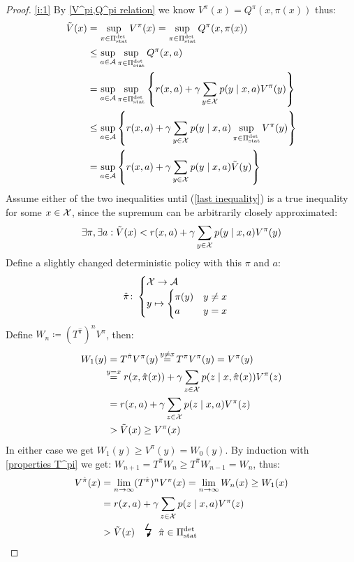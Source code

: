 \begin{proof} \ref{i:1}
By \ref{V^pi,Q^pi relation} we know \(V^\pi(x)=Q^\pi(x,\pi(x))\) thus:
\begin{align}
	\tilde{V}(x)& =\sup_{\pi \in \Pi_{\textnormal{stat}}^{\textnormal{det}}} V^\pi(x)
	=\sup_{\pi \in \Pi_{\textnormal{stat}}^{\textnormal{det}}}Q^\pi(x,\pi(x)) 
	\nonumber\\
	&\le\sup_{a\in \mathcal{A}} \sup_{\pi\in\Pi_{\textnormal{stat}}^{\textnormal{det}}} Q^\pi(x,a)\\
	&= \sup_{a\in \mathcal{A}} \sup_{\pi\in\Pi_{\textnormal{stat}}^{\textnormal{det}}} \left\{r(x,a)+\gamma\sum\limits_{y\in\mathcal{X}}p(y\mid x,a) V^\pi(y) \right\}
	\nonumber\\
	&\le\sup_{a\in \mathcal{A}}\left\{ r(x,a)+\gamma\sum\limits_{y\in\mathcal{X}}p(y\mid x,a) 
	\sup_{\pi\in\Pi_{\textnormal{stat}}^{\textnormal{det}}} V^\pi(y) \right\}
	\label{last inequality}
	\\
	&=\sup_{a\in \mathcal{A}}\left\{ r(x,a)+\gamma\sum\limits_{y\in\mathcal{X}}p(y\mid x,a) 
	 \tilde{V}(y) \right\}
\end{align}
Assume either of the two inequalities until (\ref{last inequality}) is a true inequality for some \(x\in\mathcal{X}\), since the supremum can be arbitrarily closely approximated:
\[ \exists \pi, \exists a : \tilde{V}(x) < r(x,a) + \gamma\sum_{y\in\mathcal{X}} p(y\mid x,a) V^\pi(y)\]
Define a slightly changed deterministic policy with this \(\pi\) and \(a\):
\begin{align*}
	\hat{\pi}\colon
	\begin{cases}
		\mathcal{X}\to\mathcal{A}\\
		y\mapsto
		\begin{cases}
			\pi(y) & y\neq x\\
			a & y=x
		\end{cases}
	\end{cases}
\end{align*}
Define \(W_n\coloneqq (T^{\hat{\pi}})^n V^\pi\), then:
\begin{align*}
	W_1(y)&=T^{\hat{\pi}}V^\pi(y) \xeq{y\neq x} T^\pi V^\pi(y) = V^\pi(y)\\
	&\lxeq{y=x} r(x, \hat{\pi}(x)) 
	+ \gamma \sum_{z\in\cX} p(z \mid x, \hat{\pi}(x)) V^\pi(z)  \\
	&=r(x, a) + \gamma \sum_{z\in\cX} p(z \mid x, a) V^\pi(z) \\
	&> \tilde{V}(x) \ge V^\pi(x)
\end{align*}
In either case we get \(W_1(y)\ge V^\pi(y)=W_0(y) \).
By induction with \ref{properties T^pi} we get: \(W_{n+1}=T^{\hat{\pi}}W_n \ge T^{\hat{\pi}}W_{n-1}=W_n\), thus:
\begin{align*}
	V^{\hat{\pi}}(x)&=\lim_{n\to\infty}(T^{\hat{\pi}})^n V^\pi(x)=\lim_{n\to\infty} W_n(x)\ge W_1(x) \\
	&=r(x, a) + \gamma \sum_{z\in\cX} p(z \mid x, a) V^\pi(z) \\
	&> \tilde{V}(x) \contradiction{\hat{\pi}\in\detPolicy}
\end{align*}
\end{proof}


